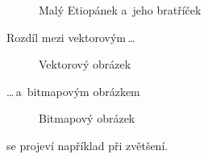\documentclass[a4paper, 11pt]{article}
\begin{document}
    \begin{figure}[h]
        \centering
        \caption{Malý Etiopánek a~jeho bratříček}
        \label{figure:etiopan}
    \end{figure}
    
    \newpage
    
    Rozdíl mezi vektorovým\,\dots
    
    \begin{figure}[h] 
        \centering
        \caption{Vektorový obrázek}
        \label{figure:vek}
    \end{figure}
    
    \bigskip
    
    \noindent \dots\,a~bitmapovým obrázkem
    
    \begin{figure}[h]
        \centering
        \caption{Bitmapový obrázek}   
        \label{figure:bit}
    \end{figure}
    \bigskip
    
    \noindent se projeví například při zvětšení.
    
\end{document}
